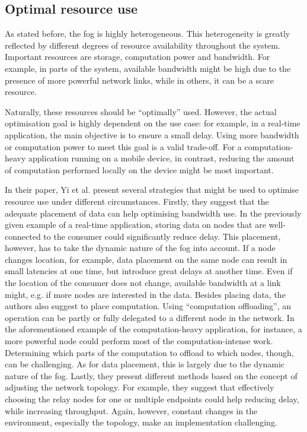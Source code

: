 \documentclass{article}
\begin{document}
\subsection{Optimal resource use}
\label{sub_opt_res_use}

As stated before, the fog is highly heterogeneous. This heterogeneity is greatly reflected by different degrees of resource availability throughout the system. Important resources are storage, computation power and bandwidth. For example, in parts of the system, available bandwidth might be high due to the presence of more powerful network links, while in others, it can be a scare resource.

Naturally, these resources should be ``optimally'' used. However, the actual optimisation goal is highly dependent on the use case: for example, in a real-time application, the main objective is to ensure a small delay. Using more bandwidth or computation power to meet this goal is a valid trade-off. For a computation-heavy application running on a mobile device, in contrast, reducing the amount of computation performed locally on the device might be most important.

In their paper, Yi et al. \cite{yi2015survey} present several strategies that might be used to optimise resource use under different circumstances. 
%
Firstly, they suggest that the adequate placement of data can help optimising bandwidth use. In the previously given example of a real-time application, storing data on nodes that are well-connected to the consumer could significantly reduce delay. This placement, however, has to take the dynamic nature of the fog into account. If a node changes location, for example, data placement on the same node can result in small latencies at one time, but introduce great delays at another time. Even if the location of the consumer does not change, available bandwidth at a link might, e.g. if more nodes are interested in the data.
%
Besides placing data, the authors also suggest to place computation. Using ``computation offloading'', an operation can be partly or fully delegated to a different node in the network. In the aforementioned example of the computation-heavy application, for instance, a more powerful node could perform most of the computation-intense work. Determining which parts of the computation to offload to which nodes, though, can be challenging. As for data placement, this is largely due to the dynamic nature of the fog.
%
Lastly, they present different methods based on the concept of adjusting the network topology. For example, they suggest that effectively choosing the relay nodes for one or multiple endpoints could help reducing delay, while increasing throughput. Again, however, constant changes in the environment, especially the topology, make an implementation challenging.
\end{document}
